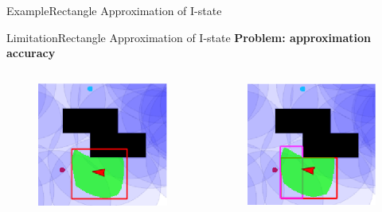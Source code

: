 \documentclass[10pt]{beamer}
\begin{document}
\begin{frame}{Example}{Rectangle Approximation of I-state}
  \begin{center}
  \end{center}
\end{frame}


\begin{frame}{Limitation}{Rectangle Approximation of I-state}
  \textbf{Problem: approximation accuracy}
   \begin{columns}
    \begin{column}{0.45\textwidth}
      \begin{figure}
        \includegraphics[width=0.5\linewidth]{figs/rect_approx}
      \end{figure}
    \end{column}
    \begin{column}{0.45\textwidth}
      \begin{figure}
        \includegraphics[width=0.5\linewidth]{figs/dbrect_approx}
      \end{figure}
    \end{column}
  \end{columns}
\end{frame}
\end{document}
